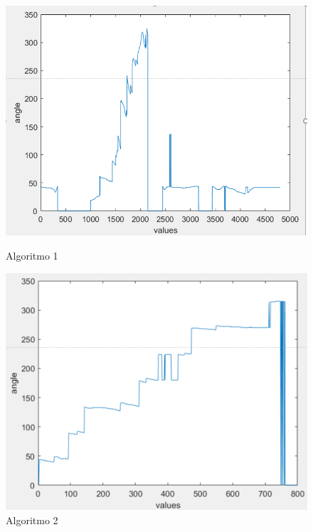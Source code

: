 \begin{figure}[!tbp]
  \centering
  \begin{minipage}[b]{0.45\textwidth}
    \includegraphics[width=\textwidth]{Figuras/alg1.PNG}
    \caption{Algoritmo 1}
    \label{1}
  \end{minipage}
  \hfill
  \begin{minipage}[b]{0.45\textwidth}
    \includegraphics[width=\textwidth]{Figuras/alg2.PNG}
    \caption{Algoritmo 2}
    \label{2}
  \end{minipage}
  
\end{figure}

